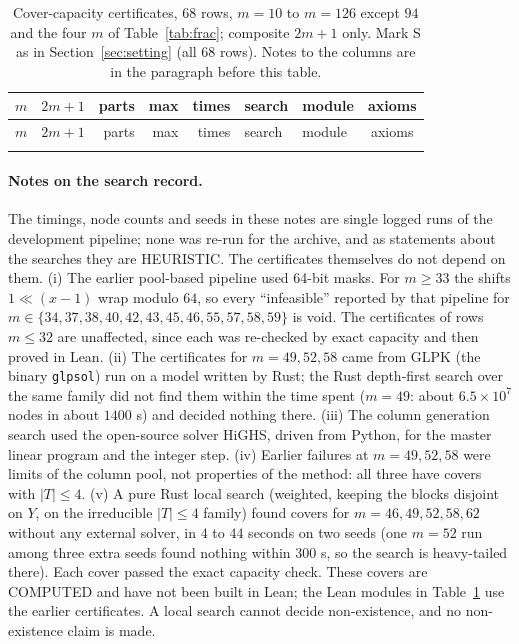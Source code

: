 \documentclass[11pt]{article}
\theoremstyle{remark}
\begin{document}
{\setlength{\tabcolsep}{3.5pt}
\begin{longtable}{rlrrrllc}
\caption{Cover-capacity certificates, $68$ rows, $m=10$ to $m=126$ except $94$ and the four $m$ of Table~\ref{tab:frac}; composite $2m+1$ only. Mark S as in Section~\ref{sec:setting} (all $68$ rows). Notes to the columns are in the paragraph before this table.}\label{tab:cc}\\
\toprule
$m$ & $2m+1$ & parts & max & times & search & module & axioms\\
\midrule
\endfirsthead
\toprule
$m$ & $2m+1$ & parts & max & times & search & module & axioms\\
\midrule
\endhead
\bottomrule
\endfoot

\end{longtable}}

\paragraph{Notes on the search record.}
The timings, node counts and seeds in these notes are single logged runs of the development pipeline; none was re-run for the archive, and as statements about the searches they are HEURISTIC. The certificates themselves do not depend on them.
(i) The earlier pool-based pipeline used 64-bit masks. For $m\ge33$ the shifts $1\ll(x-1)$ wrap modulo $64$, so every ``infeasible'' reported by that pipeline for $m\in\{34,37,38,40,42,43,45,46,55,57,58,59\}$ is void. The certificates of rows $m\le32$ are unaffected, since each was re-checked by exact capacity and then proved in Lean. (ii) The certificates for $m=49,52,58$ came from GLPK (the binary \texttt{glpsol}) run on a model written by Rust; the Rust depth-first search over the same family did not find them within the time spent ($m=49$: about $6.5\times10^7$ nodes in about $1400$ s) and decided nothing there. (iii) The column generation search used the open-source solver HiGHS, driven from Python, for the master linear program and the integer step. (iv) Earlier failures at $m=49,52,58$ were limits of the column pool, not properties of the method: all three have covers with $|T|\le4$. (v) A pure Rust local search (weighted, keeping the blocks disjoint on $Y$, on the irreducible $|T|\le4$ family) found covers for $m=46,49,52,58,62$ without any external solver, in $4$ to $44$ seconds on two seeds (one $m=52$ run among three extra seeds found nothing within $300$ s, so the search is heavy-tailed there). Each cover passed the exact capacity check. These covers are COMPUTED and have not been built in Lean; the Lean modules in Table~\ref{tab:cc} use the earlier certificates. A local search cannot decide non-existence, and no non-existence claim is made.
\end{document}
